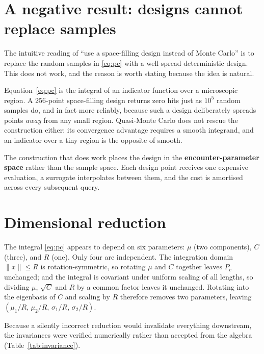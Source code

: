 \documentclass[11pt]{article}
\newcommand{\Pc}{P_c}
\begin{document}
\section{A negative result: designs cannot replace samples}\label{sec:negative}

The intuitive reading of ``use a space-filling design instead of Monte
Carlo'' is to replace the random samples in \eqref{eq:pc} with a
well-spread deterministic design. This does not work, and the reason is
worth stating because the idea is natural.

Equation~\eqref{eq:pc} is the integral of an indicator function over a
microscopic region. A 256-point space-filling design returns zero hits just
as $10^{5}$ random samples do, and in fact more reliably, because such a
design deliberately spreads points \emph{away} from any small region.
Quasi-Monte Carlo does not rescue the construction either: its convergence
advantage requires a smooth integrand, and an indicator over a tiny region
is the opposite of smooth.

The construction that does work places the design in the
\textbf{encounter-parameter space} rather than the sample space. Each design
point receives one expensive evaluation, a surrogate interpolates between
them, and the cost is amortised across every subsequent query.

\section{Dimensional reduction}\label{sec:reduction}

The integral \eqref{eq:pc} appears to depend on six parameters: $\mu$ (two
components), $C$ (three), and $R$ (one). Only four are independent. The
integration domain $\|x\| \le R$ is rotation-symmetric, so rotating $\mu$
and $C$ together leaves $\Pc$ unchanged; and the integral is covariant under
uniform scaling of all lengths, so dividing $\mu$, $\sqrt{C}$ and $R$ by a
common factor leaves it unchanged. Rotating into the eigenbasis of $C$ and
scaling by $R$ therefore removes two parameters, leaving
$(\mu_1/R,\, \mu_2/R,\, \sigma_1/R,\, \sigma_2/R)$.

Because a silently incorrect reduction would invalidate everything
downstream, the invariances were verified numerically rather than accepted
from the algebra (Table~\ref{tab:invariance}).
\end{document}
